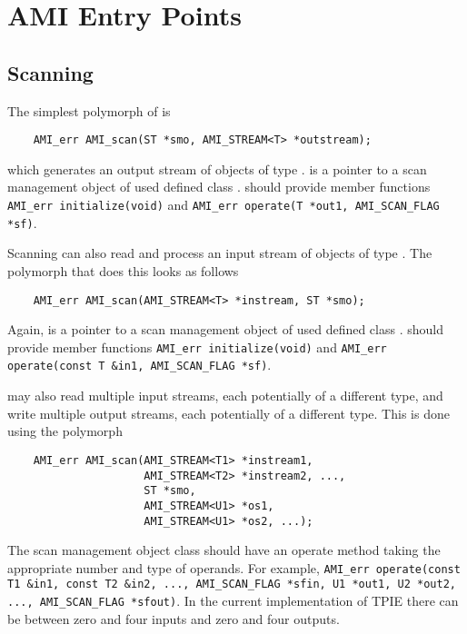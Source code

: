 \section{AMI Entry Points}


\subsection{Scanning}

The simplest polymorph of  is
\begin{verbatim}
    AMI_err AMI_scan(ST *smo, AMI_STREAM<T> *outstream);
\end{verbatim}
which generates an output stream of objects of type .
 is a pointer to a scan management object of used defined
class .   should provide member functions {\tt
  AMI\_err initialize(void)} and {\tt AMI\_err operate(T *out1,
  AMI\_SCAN\_FLAG *sf)}.

Scanning can also read and process an input stream of objects of type
.  The polymorph that does this looks as follows
\begin{verbatim}
    AMI_err AMI_scan(AMI_STREAM<T> *instream, ST *smo);
\end{verbatim}
Again,  is a pointer to a scan management object of used
defined class .   should provide member functions
{\tt AMI\_err initialize(void)} and {\tt AMI\_err operate(const T
  \&in1, AMI\_SCAN\_FLAG *sf)}.

 may also read multiple input streams, each
potentially of a different type, and write multiple output streams,
each potentially of a different type.  This is done using the polymorph
\begin{verbatim}
    AMI_err AMI_scan(AMI_STREAM<T1> *instream1, 
                     AMI_STREAM<T2> *instream2, ..., 
                     ST *smo, 
                     AMI_STREAM<U1> *os1, 
                     AMI_STREAM<U1> *os2, ...);
\end{verbatim}
The scan management object class  should have an operate
method taking the appropriate number and type of operands.  For
example, {\tt AMI\_err operate(const T1 \&in1, const T2 \&in2, ...,
  AMI\_SCAN\_FLAG *sfin, U1 *out1, U2 *out2, ..., AMI\_SCAN\_FLAG
  *sfout)}.  In the current implementation of TPIE there can be
between zero and four inputs and zero and four outputs.


